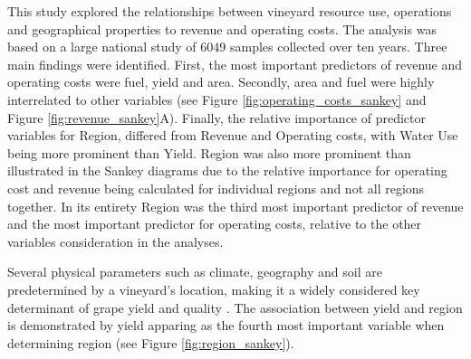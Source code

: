 \documentclass[review,12pt,authoryear]{elsarticle}
\begin{document}
\begin{linenumbers}
This study explored the relationships between vineyard resource use, operations and geographical properties to revenue and operating costs. The analysis was based on a large national study of 6049 samples collected over ten years. Three main findings were identified. First, the most important predictors of revenue and operating costs were fuel, yield and area. Secondly, area and fuel were highly interrelated to other variables (see Figure \ref{fig:operating_costs_sankey} and Figure \ref{fig:revenue_sankey}A). Finally, the relative importance of predictor variables for Region, differed from Revenue and Operating costs, with Water Use being more prominent than Yield. Region was also more prominent than illustrated in the Sankey diagrams due to the relative importance for operating cost and revenue being calculated for individual regions and not all regions together. In its entirety Region was the third most important predictor of revenue and the most important predictor for operating costs, relative to the other variables consideration in the analyses.
\par
Several physical parameters such as climate, geography and soil are predetermined by a vineyard's location, making it a widely considered key determinant of grape yield and quality \citep{abbalDecisionSupportSystem2016,agostaRegionalClimateVariability2012,fragaMultivariateClusteringViticultural2017}.
The association between yield and region is demonstrated by yield apparing as the fourth most important variable when determining region (see Figure \ref{fig:region_sankey}).
\par

\end{linenumbers}
\end{document}
